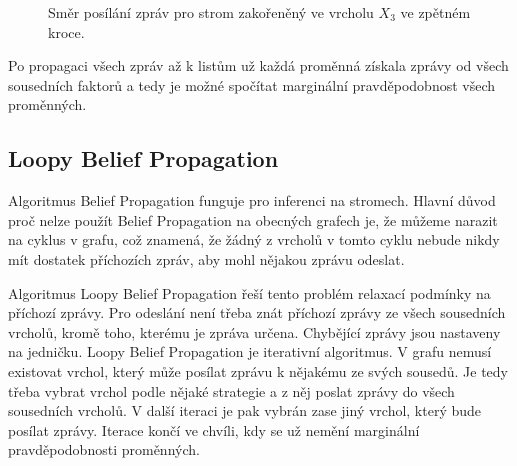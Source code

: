 \begin{figure}[H]
\begin{center}
\end{center}
\caption{Směr posílání zpráv pro strom zakořeněný ve vrcholu $X_3$ ve zpětném kroce.}
\end{figure}

Po propagaci všech zpráv až k listům už každá proměnná získala zprávy od všech sousedních faktorů a tedy je možné spočítat marginální pravděpodobnost všech proměnných.

\subsection{Loopy Belief Propagation}

Algoritmus Belief Propagation funguje pro inferenci na stromech.
Hlavní důvod proč nelze použít Belief Propagation na obecných grafech je, že můžeme narazit na cyklus v grafu, což znamená, že žádný z vrcholů v tomto cyklu nebude nikdy mít dostatek příchozích zpráv, aby mohl nějakou zprávu odeslat.

Algoritmus Loopy Belief Propagation řeší tento problém relaxací podmínky na příchozí zprávy.
Pro odeslání není třeba znát příchozí zprávy ze všech sousedních vrcholů, kromě toho, kterému je zpráva určena.
Chybějící zprávy jsou nastaveny na jedničku.
Loopy Belief Propagation je iterativní algoritmus.
V grafu nemusí existovat vrchol, který může posílat zprávu k nějakému ze svých sousedů.
Je tedy třeba vybrat vrchol podle nějaké strategie a z něj poslat zprávy do všech sousedních vrcholů.
V další iteraci je pak vybrán zase jiný vrchol, který bude posílat zprávy.
Iterace končí ve chvíli, kdy se už nemění marginální pravděpodobnosti proměnných.

